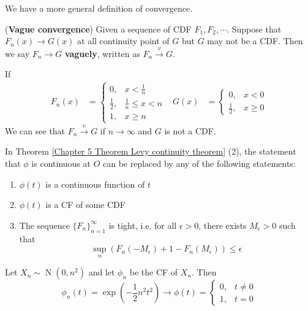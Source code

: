 \documentclass{huhtakm-template-book}
\DeclareMathOperator{\N}{N}
\begin{document}
We have a more general definition of convergence.
\begin{defn}(\textbf{Vague convergence})
	Given a sequence of CDF $F_{1},F_{2},\cdots$. Suppose that $F_{n}(x)\to G(x)$ at all continuity point of $G$ but $G$ may not be a CDF. Then we say $F_{n}\to G$ \textbf{vaguely}, written as $F_{n}\xrightarrow{v}G$.
\end{defn}
\begin{eg}
	If
	\begin{align*}
		F_{n}(x)&=\begin{cases}
			0, &x<\frac{1}{n}\\
			\frac{1}{2}, &\frac{1}{n}\leq x<n\\
			1, &x\geq n
		\end{cases} & G(x)&=\begin{cases}
			0, &x<0\\
			\frac{1}{2}, &x\geq 0
		\end{cases}
	\end{align*}
	We can see that $F_{n}\xrightarrow{v}G$ if $n\to\infty$ and $G$ is not a CDF.
\end{eg}
\begin{rem}
	In Theorem \ref{Chapter 5 Theorem Levy continuity theorem} (2), the statement that $\phi$ is continuous at $O$ can be replaced by any of the following statements:
	\begin{enumerate}
		\item $\phi(t)$ is a continuous function of $t$
		\item $\phi(t)$ is a CF of some CDF
		\item The sequence $\{F_{n}\}_{n=1}^{\infty}$ is tight, i.e. for all $\epsilon>0$, there exists $M_{\epsilon}>0$ such that
		\begin{equation*}
			\sup_{n}(F_{n}(-M_{\epsilon})+1-F_{n}(M_{\epsilon}))\leq\epsilon
		\end{equation*}
	\end{enumerate}
\end{rem}
\begin{eg}
	Let $X_{n}\sim\N(0,n^{2})$ and let $\phi_{n}$ be the CF of $X_{n}$. Then
	\begin{equation*}
		\phi_{n}(t)=\exp\left(-\frac{1}{2}n^{2}t^{2}\right)\to\phi(t)=\begin{cases}
			0, &t\neq 0\\
			1, &t=0
		\end{cases}
	\end{equation*}
\end{eg}
\end{document}
